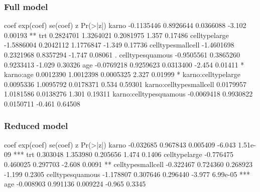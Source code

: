 \begin{frame}[fragile]
\frametitle{Full model}
\hspace*{-0.3in}
\begin{Rout}{-0.05}
                              coef  exp(coef)   se(coef)      z Pr(>|z|)
karno                   -0.1135446  0.8926644  0.0366088 -3.102  0.00193 **
trt                      0.2824701  1.3264021  0.2081975  1.357  0.17486
celltypelarge           -1.5886004  0.2042112  1.1776847 -1.349  0.17736
celltypesmallcell       -1.4601698  0.2321968  0.8357294 -1.747  0.08061 .
celltypesquamous        -0.9505561  0.3865260  0.9233413 -1.029  0.30326
age                     -0.0769218  0.9259623  0.0313400 -2.454  0.01411 *
karno:age                0.0012390  1.0012398  0.0005325  2.327  0.01999 *
karno:celltypelarge      0.0095336  1.0095792  0.0178371  0.534  0.59301
karno:celltypesmallcell  0.0179957  1.0181586  0.0138276  1.301  0.19311
karno:celltypesquamous  -0.0069418  0.9930822  0.0150711 -0.461  0.64508
\end{Rout}
\end{frame}

\begin{frame}[fragile]
\frametitle{Reduced model}
\hspace*{-0.3in}
\begin{Rout}{-0.05}
                       coef exp(coef)  se(coef)      z Pr(>|z|)
karno             -0.032685  0.967843  0.005409 -6.043 1.51e-09 ***
trt                0.303048  1.353980  0.205656  1.474   0.1406
celltypelarge     -0.776475  0.460025  0.297703 -2.608   0.0091 **
celltypesmallcell -0.322467  0.724360  0.268923 -1.199   0.2305
celltypesquamous  -1.178807  0.307646  0.296440 -3.977 6.99e-05 ***
age               -0.008903  0.991136  0.009224 -0.965   0.3345
\end{Rout}
\end{frame}


